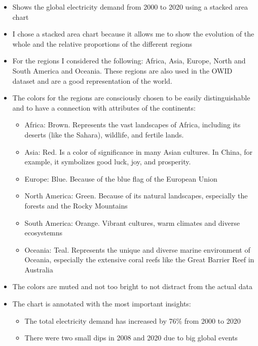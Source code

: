 \documentclass{article}
\begin{document}
\begin{itemize}
    \item Shows the global electricity demand from 2000 to 2020 using a stacked area chart
    \item I chose a stacked area chart because it allows me to show the evolution of the whole and the relative proportions of the different regions
    \item For the regions I considered the following: Africa, Asia, Europe, North and South America and Oceania. These regions are also used in the OWID dataset and are a good representation of the world.
    \item The colors for the regions are consciously chosen to be easily distinguishable and to have a connection with attributes of the continents:
        \begin{itemize}
            \item Africa: Brown. Represents the vast landscapes of Africa, including its deserts (like the Sahara), wildlife, and fertile lands.
            \item Asia: Red. Is a color of significance in many Asian cultures. In China, for example, it symbolizes good luck, joy, and prosperity.
            \item Europe: Blue. Because of the blue flag of the European Union
            \item North America: Green. Because of its natural landscapes, especially the forests and the Rocky Mountains
            \item South America: Orange. Vibrant cultures, warm climates and diverse ecosystemns
            \item Oceania: Teal. Represents the unique and diverse marine environment of Oceania, especially the extensive  coral reefs like the Great Barrier Reef in Australia
        \end{itemize}
    \item The colors are muted and not too bright to not distract from the actual data
    \item The chart is annotated with the most important insights:
    \begin{itemize}
        \item The total electricity demand has increased by 76\% from 2000 to 2020
        \item There were two small dips in 2008 and 2020 due to big global events
    \end{itemize}
\end{itemize}
\end{document}

